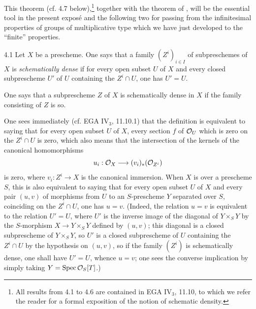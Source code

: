 This theorem (cf. 4.7 below),\footnote{All results from 4.1 to 4.6 are contained in EGA IV$_3$, 11.10, to which we refer the reader for a formal exposition of the notion of schematic density.} together with the theorem of , will be the essential tool in the present expos\'e and the following two for passing from the infinitesimal properties of groups of multiplicative type which we have just developed to the ``finite'' properties.
\begin{definition}{4.1}\label{IX.4.1}
Let $X$ be a prescheme. One says that a family $(Z^i)_{i\in I}$ of subpreschemes of $X$ is \emph{schematically dense} if for every open subset $U$ of $X$ and every closed subprescheme $U'$ of $U$ containing the $Z^i\cap U$, one has $U'=U$.

One says that a subprescheme $Z$ of $X$ is schematically dense in $X$ if the family consisting of $Z$ is so.
\end{definition}
One sees immediately (cf. EGA IV$_3$, 11.10.1) that the definition is equivalent to saying that for every open subset $U$ of $X$, every section $f$ of $\mathcal{O}_U$ which is zero on the $Z^i\cap U$ is zero, which also means that the intersection of the kernels of the canonical homomorphisms
\[
u_i:\mathcal{O}_X\longrightarrow(v_i)_*(\mathcal{O}_{Z^i})
\]
is zero, where $v_i:Z^i\to X$ is the canonical immersion. When $X$ is over a prescheme $S$, this is also equivalent to saying that for every open subset $U$ of $X$ and every pair $(u,v)$ of morphisms from $U$ to an $S$-prescheme $Y$ separated over $S$, coinciding on the $Z^i\cap U$, one has $u=v$. (Indeed, the relation $u=v$ is equivalent to the relation $U'=U$, where $U'$ is the inverse image of the diagonal of $Y\times_S Y$ by the $S$-morphism $X\to Y\times_S Y$ defined by $(u,v)$; this diagonal is a closed subprescheme of $Y\times_S Y$, so $U'$ is a closed subprescheme of $U$ containing the $Z^i\cap U$ by the hypothesis on $(u,v)$, so if the family $(Z^i)$ is schematically dense, one shall have $U'=U$, whence $u=v$; one sees the converse implication by simply taking $Y=\operatorname{Spec}\mathcal{O}_S[T]$.)


